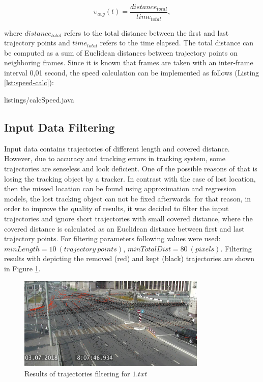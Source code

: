 \begin{equation} \label{eq:avg_speed}
	\upsilon_{avg}(t) = \frac{distance_{total}} {time_{total}},
\end{equation}

where $distance_{total}$ refers to the total distance between the first and last trajectory points and $time_{total}$ refers to the time elapsed. The total distance can be computed as a sum of Euclidean distances between trajectory points on neighboring frames. Since it is known that frames are taken with an inter-frame interval 0,01 second, the speed calculation can be implemented as follows (Listing \ref{lst:speed-calc}):

\lstset{style=code-style-java}
 {listings/calcSpeed.java}

\subsection{Input Data Filtering}

Input data contains trajectories of different length and covered distance. However, due to accuracy and tracking errors in tracking system, some trajectories are senseless and look deficient. One of the possible reasons of that is losing the tracking object by a tracker. In contrast with the case of lost location, then the missed location can be found using approximation and regression models, the lost tracking object can not be fixed afterwards. for that reason, in order to improve the quality of results, it was decided to filter the input trajectories and ignore short trajectories with small covered distance, where the covered distance is calculated as an Euclidean distance between first and last trajectory points. For filtering parameters following values were used: $minLength = 10\ (trajectory\ points)$, $minTotalDist = 80\ (pixels)$. Filtering results with depicting the removed (red) and kept (black) trajectories are shown in Figure \ref{fig:traj_filter}.

\begin{figure}[!htb]
	\centering{}
	\includegraphics[width=0.8\textwidth]{images/traj-filter-res.jpeg}
	\caption{Results of trajectories filtering for $1.txt$}
	\label{fig:traj_filter}
\end{figure}

